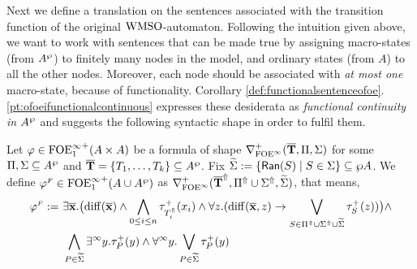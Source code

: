 Next we define a translation on the sentences associated with the
transition function of the original $\mathrm{WMSO}$-automaton. Following the intuition given above, we want to work with sentences that can be made true by assigning macro-states (from $A^{\wp}$) to finitely many nodes in the model, and ordinary states (from $A$) to all the other nodes. Moreover, each node should be associated with \emph{at most one} macro-state, because of functionality. Corollary \ref{def:functionalsentenceofoe}.\ref{pt:ofoeifunctionalcontinuous} expresses these desiderata as \emph{functional continuity in $A^{\wp}$} and suggests the following syntactic shape in order to fulfil them.

\begin{definition}\label{DEF_finitary_lifting}
Let $\varphi \in {\ensuremath{\mathrm{FOE}^{\infty}_1}}^+(A \times A)$ be a formula of shape $\nabla^+_{\mathrm{FOE}^{\infty}}(\overline{{\mathbf{T}}},\Pi,\Sigma)$ for some $\Pi,\Sigma \subseteq A^{\wp}$ and $\overline{{\mathbf{T}}} = \{T_1,\dots,T_k\} \subseteq A^{\wp}$. Fix $\widetilde{\Sigma} \mathrel{: =} \{\mathsf{Ran}(S) \mid S \in \Sigma\} \subseteq \wp A$. We define $\varphi^{{\scriptscriptstyle F}} \in {\ensuremath{\mathrm{FOE}^{\infty}_1}}^+(A \cup A^{\wp})$ as $\nabla^+_{\mathrm{FOE}^{\infty}}(\overline{{\mathbf{T}}}^{\Uparrow},\Pi^{\Uparrow} \cup \Sigma^{\Uparrow},\widetilde{\Sigma})$, that means,
\begin{equation}\label{eq:unfoldingNablaolque}
\begin{aligned}
\varphi^{\fin} \df\ &
    \exists \vlist{x}.\big(\arediff{\vlist{x}} \land \bigwedge_{0 \leq i \leq n} \tau^+_{\lift{T}_i}(x_i)
\land
    \forall z.(\arediff{\vlist{x},z} \lthen \bigvee_{S\in \lift{\Pi} \cup \lift{\Sigma} \cup \widetilde{\Sigma}} \tau^+_S(z))\big)
\land
\\ & 
    \bigwedge_{P\in\widetilde{\Sigma}} \qu y.{\tau}^{+}_P(y)
 \land
    \dqu y.\bigvee_{P\in\widetilde{\Sigma}} {\tau}^{+}_P(y)
    \end{aligned}
\end{equation}
\end{definition}


